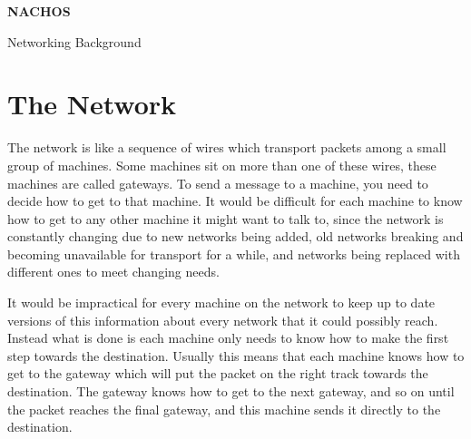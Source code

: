 

\begin{center}
{\large {\bf NACHOS}}


Networking Background
\end{center}

\vspace{.2in}

\section{The Network}



The network is like a sequence of wires which transport packets among 
a small group of machines.  Some machines sit on more than one of these
wires, these machines are called gateways.  To send a message to a machine,
you need to decide how to get to that machine.  It would be difficult for
each machine to know how to get to any other machine it might want to talk
to, since the network is constantly changing due to new networks being added,
old networks breaking and becoming unavailable for transport for a while,
and networks being replaced with different ones to meet changing needs.

It would be impractical for every machine on the network to keep up to date
versions of this information about every network that it could possibly reach.
Instead what is done is each machine only needs to know how to make the first
step towards the destination.  Usually this means that each machine knows
how to get to the gateway which will put the packet on the right track towards
the destination.  The gateway knows how to get to the next gateway, and
so on until the packet reaches the final gateway, and this machine 
sends it directly to the destination.

